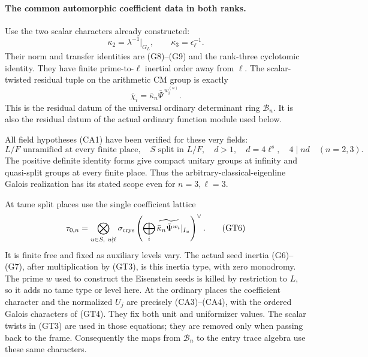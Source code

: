 \paragraph{The common automorphic coefficient data in both ranks.}
Use the two scalar characters already constructed:
\[
                       \kappa_2=\lambda^{-1}|_{G_L},
                          \qquad \kappa_3=\epsilon_\ell^{-1}.
 \tag{GT3}
\]
Their norm and transfer identities are (G8)--(G9)
and the rank-three cyclotomic identity.
They have finite prime-to-\(\ell\) inertial order
away from \(\ell\).
The scalar-twisted residual tuple on the arithmetic
CM group is exactly
\[
            \bar\chi_i=\bar\kappa_n\bar\Psi^{\,w_i^{(n)}}.
 \tag{GT4}
\]
This is the residual datum of the universal ordinary
determinant ring \(\mathcal B_n\).
It is also the residual datum of the actual
ordinary function module used below.

All field hypotheses (CA1) have been verified for
these very fields:
\[
 L/F\text{ unramified at every finite place},\quad
 S\text{ split in }L/F,\quad d>1,\quad
                    d=4\ell^s,\quad4\mid nd
                       \quad(n=2,3).
 \tag{GT5}
\]
The positive definite identity forms give compact
unitary groups at infinity and quasi-split groups
at every finite place.
Thus the arbitrary-classical-eigenline Galois
realization has its stated scope even for \(n=3,\ell=3\).

At tame split places use the single coefficient lattice
\[
 \tau_{0,n}=\bigotimes_{u\in S,\ u\nmid\ell}
       \sigma_{\rm crys}
       \left(\bigoplus_i
          \widetilde{\bar\kappa_n\bar\Psi^{w_i}}|_{I_u}\right)^\vee.
 \tag{GT6}
\]
It is finite free and fixed as auxiliary levels vary.
The actual seed inertia (G6)--(G7), after multiplication
by (GT3), is this inertia type, with zero monodromy.
The prime \(w\) used to construct the Eisenstein seeds
is killed by restriction to \(L\), so it adds no tame
type or level here.
At the ordinary places the coefficient character
and the normalized \(U_j\) are precisely (CA3)--(CA4),
with the ordered Galois characters of (GT4).
They fix both unit and uniformizer values.
The scalar twists in (GT3) are used in those equations;
they are removed only when passing back to the frame.
Consequently the maps from \(\mathcal B_n\) to the
entry trace algebra use these same characters.

